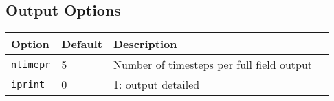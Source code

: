 \documentclass[draft]{book}
\begin{document}
\subsection{Output Options}

\begin{tabular}{llll}
  \textbf{Option}&\textbf{Default}&\textbf{Description}\\
  \hline
  \texttt{ntimepr}   & 5 & Number of timesteps per full field output\\
  \texttt{iprint}    & 0              & 1: output detailed 
\end{tabular}




\end{document}
